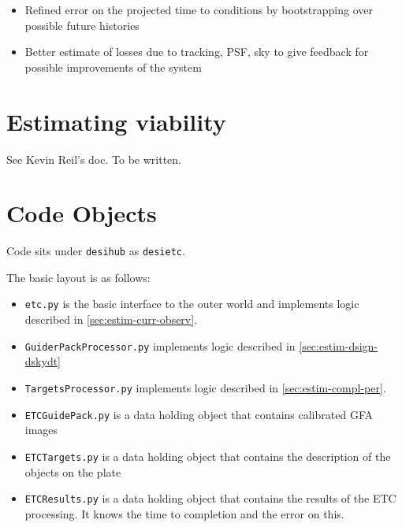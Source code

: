 \documentclass{article}
\begin{document}
\pr
\begin{itemize}
\item Refined error on the projected time to conditions by
  bootstrapping over possible future histories
\item Better estimate of losses due to tracking, PSF, sky to give
  feedback for possible improvements of the system
\end{itemize}


\section{Estimating viability}

See Kevin Reil's doc. To be written.






\section{Code Objects}

Code sits under \texttt{desihub} as \texttt{desietc}. 

The basic layout
is as follows:

\begin{itemize}
\item \texttt{etc.py} is the basic interface to the outer world and
  implements logic described in \ref{sec:estim-curr-observ}.
\item \texttt{GuiderPackProcessor.py} implements logic described in 
\ref{sec:estim-dsign-dskydt}
\item \texttt{TargetsProcessor.py} implements logic described in
  \ref{sec:estim-compl-per}.
\item \texttt{ETCGuidePack.py} is a data holding object that contains
  calibrated GFA images
\item \texttt{ETCTargets.py} is a data holding object that contains
  the description of the objects on the plate
\item \texttt{ETCResults.py} is a data holding object that contains
  the results of the ETC processing. It knows the time to completion
  and the error on this.
\end{itemize}
\end{document}
